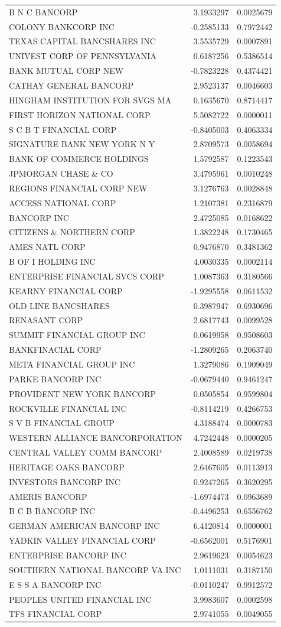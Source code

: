 \documentclass[11pt,]{article}
\begin{document}
\begin{longtable}[]{@{}lrr@{}}
B N C BANCORP & 3.1933297 & 0.0025679\tabularnewline
COLONY BANKCORP INC & -0.2585133 & 0.7972442\tabularnewline
TEXAS CAPITAL BANCSHARES INC & 3.5535729 & 0.0007891\tabularnewline
UNIVEST CORP OF PENNSYLVANIA & 0.6187256 & 0.5386514\tabularnewline
BANK MUTUAL CORP NEW & -0.7823228 & 0.4374421\tabularnewline
CATHAY GENERAL BANCORP & 2.9523137 & 0.0046603\tabularnewline
HINGHAM INSTITUTION FOR SVGS MA & 0.1635670 & 0.8714417\tabularnewline
FIRST HORIZON NATIONAL CORP & 5.5082722 & 0.0000011\tabularnewline
S C B T FINANCIAL CORP & -0.8405003 & 0.4063334\tabularnewline
SIGNATURE BANK NEW YORK N Y & 2.8709573 & 0.0058694\tabularnewline
BANK OF COMMERCE HOLDINGS & 1.5792587 & 0.1223543\tabularnewline
JPMORGAN CHASE \& CO & 3.4795961 & 0.0010248\tabularnewline
REGIONS FINANCIAL CORP NEW & 3.1276763 & 0.0028848\tabularnewline
ACCESS NATIONAL CORP & 1.2107381 & 0.2316879\tabularnewline
BANCORP INC & 2.4725085 & 0.0168622\tabularnewline
CITIZENS \& NORTHERN CORP & 1.3822248 & 0.1730465\tabularnewline
AMES NATL CORP & 0.9476870 & 0.3481362\tabularnewline
B OF I HOLDING INC & 4.0030335 & 0.0002114\tabularnewline
ENTERPRISE FINANCIAL SVCS CORP & 1.0087363 & 0.3180566\tabularnewline
KEARNY FINANCIAL CORP & -1.9295558 & 0.0611532\tabularnewline
OLD LINE BANCSHARES & 0.3987947 & 0.6930696\tabularnewline
RENASANT CORP & 2.6817743 & 0.0099528\tabularnewline
SUMMIT FINANCIAL GROUP INC & 0.0619958 & 0.9508603\tabularnewline
BANKFINACIAL CORP & -1.2809265 & 0.2063740\tabularnewline
META FINANCIAL GROUP INC & 1.3279086 & 0.1909049\tabularnewline
PARKE BANCORP INC & -0.0679440 & 0.9461247\tabularnewline
PROVIDENT NEW YORK BANCORP & 0.0505854 & 0.9599804\tabularnewline
ROCKVILLE FINANCIAL INC & -0.8114219 & 0.4266753\tabularnewline
S V B FINANCIAL GROUP & 4.3188474 & 0.0000783\tabularnewline
WESTERN ALLIANCE BANCORPORATION & 4.7242448 & 0.0000205\tabularnewline
CENTRAL VALLEY COMM BANCORP & 2.4008589 & 0.0219738\tabularnewline
HERITAGE OAKS BANCORP & 2.6467605 & 0.0113913\tabularnewline
INVESTORS BANCORP INC & 0.9247265 & 0.3620295\tabularnewline
AMERIS BANCORP & -1.6974473 & 0.0963689\tabularnewline
B C B BANCORP INC & -0.4496253 & 0.6556762\tabularnewline
GERMAN AMERICAN BANCORP INC & 6.4120814 & 0.0000001\tabularnewline
YADKIN VALLEY FINANCIAL CORP & -0.6562001 & 0.5176901\tabularnewline
ENTERPRISE BANCORP INC & 2.9619623 & 0.0054623\tabularnewline
SOUTHERN NATIONAL BANCORP VA INC & 1.0111031 & 0.3187150\tabularnewline
E S S A BANCORP INC & -0.0110247 & 0.9912572\tabularnewline
PEOPLES UNITED FINANCIAL INC & 3.9983607 & 0.0002598\tabularnewline
TFS FINANCIAL CORP & 2.9741055 & 0.0049055\tabularnewline

\end{longtable}
\end{document}
